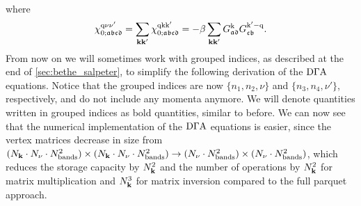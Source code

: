 \documentclass[../../main.tex]{subfiles}
\begin{document}
where
\begin{align}
	\chi_{0;\mathfrak{abcd}}^{\text{q}\nu\nu'}=\sum_{\textbf{kk}'}\chi_{0;\mathfrak{abcd}}^{\text{q}\text{k}\text{k}'}=-\beta\sum_{\textbf{kk}'}G^{\text{k}}_{\mathfrak{ad}}G^{\text{k}'-\text{q}}_{\mathfrak{cb}}.
\end{align}
From now on we will sometimes work with grouped indices, as described at the end of \ref{sec:bethe_salpeter}, to simplify the following derivation of the $\text{D}\Gamma\text{A}$ equations. Notice that the grouped indices are now $\{ n_1,n_2,\nu \}$ and $\{ n_3,n_4,\nu' \}$, respectively, and do not include any momenta anymore. We will denote quantities written in grouped indices as bold quantities, similar to before. We can now see that the numerical implementation of the $\text{D}\Gamma\text{A}$ equations is easier, since the vertex matrices decrease in size from $(N_{\textbf{k}}\cdot N_{\nu} \cdot N_{\text{bands}}^2)\times(N_{\textbf{k}}\cdot N_{\nu} \cdot N_{\text{bands}}^2) \to (N_{\nu} \cdot N_{\text{bands}}^2)\times(N_{\nu} \cdot N_{\text{bands}}^2)$, which reduces the storage capacity by $N_{\textbf{k}}^2$ and the number of operations by $N_{\textbf{k}}^2$ for matrix multiplication and $N_{\textbf{k}}^3$ for matrix inversion compared to the full parquet approach.
\end{document}
